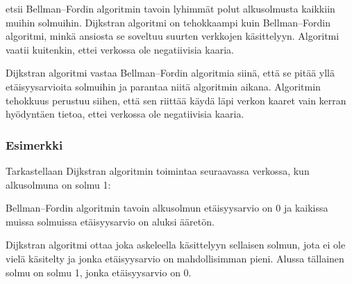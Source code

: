 
 etsii Bellman–Fordin
algoritmin tavoin lyhimmät polut
alkusolmusta kaikkiin muihin solmuihin.
Dijkstran algoritmi on tehokkaampi kuin
Bellman–Fordin algoritmi,
minkä ansiosta se soveltuu suurten
verkkojen käsittelyyn.
Algoritmi vaatii kuitenkin,
ettei verkossa ole negatiivisia kaaria.

Dijkstran algoritmi vastaa
Bellman–Fordin algoritmia siinä,
että se pitää
yllä etäisyysarvioita solmuihin
ja parantaa niitä algoritmin aikana.
Algoritmin tehokkuus perustuu
siihen, että sen riittää käydä läpi
verkon kaaret vain kerran
hyödyntäen tietoa,
ettei verkossa ole negatiivisia kaaria.

\subsubsection{Esimerkki}

Tarkastellaan Dijkstran algoritmin toimintaa
seuraavassa verkossa, kun alkusolmuna
on solmu 1:
\begin{center}
\end{center}
Bellman–Fordin algoritmin tavoin
alkusolmun etäisyysarvio on 0
ja kaikissa muissa solmuissa etäisyysarvio
on aluksi ääretön.

Dijkstran algoritmi
ottaa joka askeleella käsittelyyn
sellaisen solmun,
jota ei ole vielä käsitelty
ja jonka etäisyysarvio on
mahdollisimman pieni.
Alussa tällainen solmu on solmu 1,
jonka etäisyysarvio on 0.

